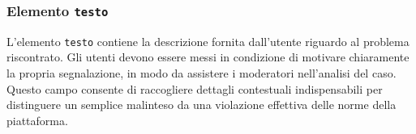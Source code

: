 \documentclass[a4paper,12pt]{report}
\begin{document}
\subsubsection*{Elemento \texttt{testo}}
L’elemento \texttt{testo} contiene la descrizione fornita dall’utente riguardo al problema 
riscontrato.  
Gli utenti devono essere messi in condizione di motivare chiaramente la propria segnalazione, 
in modo da assistere i moderatori nell’analisi del caso.  
Questo campo consente di raccogliere dettagli contestuali indispensabili 
per distinguere un semplice malinteso da una violazione effettiva delle norme della piattaforma.
\end{document}
